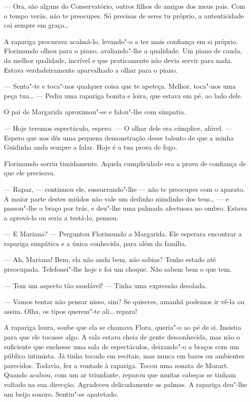 --- Ora, são alguns do Conservatório, outros filhos de amigos dos meus
pais. Com o tempo verás, não te preocupes. Só precisas de seres tu
próprio, a autenticidade cai sempre em graça\ldots{}

A rapariga procurava acalmá-lo, levando"-o a ter mais confiança em si
próprio. Florimundo olhou para o piano, avaliando"-lhe a qualidade. Um
piano de cauda, da melhor qualidade, incrível e que praticamente não
devia servir para nada. Estava verdadeiramente aparvalhado a olhar para
o piano.

--- Senta"-te e toca"-nos qualquer coisa que te apeteça. Melhor, toca"-nos
uma peça tua\ldots{} --- Pediu uma rapariga bonita e loira, que estava em pé,
ao lado dele.

O pai de Margarida aproximou"-se e falou"-lhe com simpatia.

--- Hoje teremos espectáculo, espero. --- O olhar dele era cúmplice, afável.
--- Espero que nos dês uma pequena demonstração desse talento de que a
minha Guidinha anda sempre a falar. Hoje é a tua prova de fogo.

Florimundo sorriu timidamente. Aquela cumplicidade era a prova de
confiança de que ele precisava.

--- Rapaz, --- continuou ele, sussurrando"-lhe --- não te preocupes com o
aparato. A maior parte destes miúdos não vale um dedinho mindinho dos
teus\ldots{} --- e passou"-lhe o braço por trás, e deu"-lhe uma palmada afectuosa
no ombro. Estava a aprová-lo ou seria a testá-lo, pensou.

--- E Mariana? --- Perguntou Florimundo a Margarida. Ele esperara encontrar
a rapariga simpática e a única conhecida, para além da família.

--- Ah, Mariana! Bem, ela não anda bem, não sabias? Tenho estado até
preocupada. Telefonei"-lhe hoje e foi um choque. Não sabem bem o que tem.

--- Tem um aspecto tão saudável! --- Tinha uma expressão desolada.

--- Vamos tentar não pensar nisso, sim? Se quiseres, amanhã podemos ir
vê-la ou assim. Olha, os tipos querem"-te ali\ldots{} repara!

A rapariga loura, soube que ela se chamava Flora, queria"-o ao pé de si.
Insistia para que ele tocasse algo. A sala estava cheia de gente
desconhecida, mas não o suficiente que enchesse uma sala de
espectáculos, deixando"-o a braços com um público intimista. Já tinha
tocado em recitais, mas nunca em bares ou ambientes parecidos. Todavia,
fez a vontade à rapariga. Tocou uma sonata de Mozart. Quando acabou, com
um ar triunfante, reparou que muitas cabeças se tinham voltado na sua
direcção. Agradeceu delicadamente as palmas. A rapariga deu"-lhe um beijo
sonoro. Sentiu"-se apatetado.

